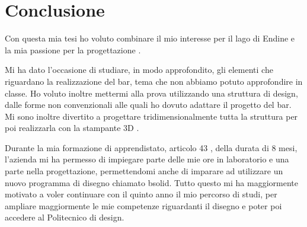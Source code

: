 \section{Conclusione}


Con questa mia tesi ho voluto combinare il mio interesse per il lago di Endine e la mia passione per la progettazione .

Mi ha dato l’occasione di  studiare, in modo approfondito, gli elementi che riguardano la realizzazione del bar, tema che non abbiamo potuto approfondire in classe.
Ho voluto inoltre mettermi alla prova utilizzando una struttura di design, dalle forme non convenzionali alle quali ho dovuto adattare il progetto del bar. 
Mi sono inoltre divertito a progettare tridimensionalmente tutta la struttura  per poi realizzarla con la stampante 3D .

Durante la mia formazione di apprendistato, articolo 43 , della durata di 8 mesi, l’azienda  mi ha permesso di impiegare parte delle mie ore in  laboratorio e una parte nella progettazione, permettendomi  anche di imparare ad utilizzare un nuovo programma di disegno chiamato bsolid. 
Tutto questo mi ha maggiormente motivato a voler continuare con il quinto anno il mio percorso di studi, per ampliare maggiormente le mie competenze riguardanti il disegno  e  poter poi accedere al Politecnico di design.    \cite{maggioli} ~ \cite{endine} ~ \cite{-_di_-_tecnica_here_2017} \cite{commercio} \cite{decreto}  \cite{design}
\cite{banconemis} \cite{bancone}  \cite{celle}
 \cite{caffe} \cite{decreto2} \cite{acqua} \cite{argine} \cite{documenti} \cite{barriere}

